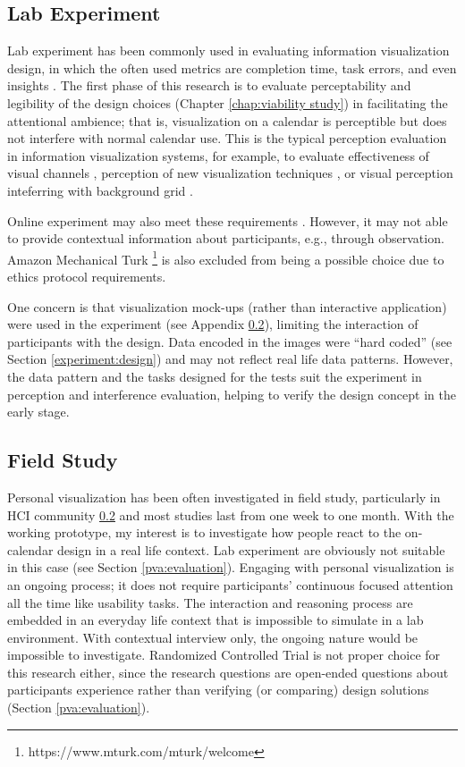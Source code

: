 \documentclass[12pt,oneside]{book}
\begin{document}
\subsection{Lab Experiment}
Lab experiment has been commonly used in evaluating information visualization design, in which the often used metrics are completion time, task errors, and even insights \cite{saraiya_evaluation_2004}.
The first phase of this research is to evaluate perceptability and legibility of the design choices (Chapter \ref{chap:viability study}) in facilitating the attentional ambience; that is, visualization on a calendar is perceptible but does not interfere with normal calendar use.  This is the typical perception evaluation in information visualization systems, for example, to evaluate effectiveness of visual channels \cite{mackinlay_automating_1986}, perception of new visualization techniques \cite{heer_sizing_2009}, or visual perception inteferring with background grid \cite{bartram_effect_2011}.

Online experiment may also meet these requirements \cite{cawthon_effect_2007}. However, it may not able to provide contextual information about participants, e.g., through observation. Amazon Mechanical Turk \footnote{https://www.mturk.com/mturk/welcome} is also excluded from being a possible choice due to ethics protocol requirements. 

One concern is that visualization mock-ups (rather than interactive application) were used in the experiment (see Appendix \ref{}), limiting the interaction of participants with the design.  Data encoded in the images were ``hard coded'' (see Section \ref{experiment:design}) and may not reflect real life data patterns.  However, the data pattern and the tasks designed for the tests suit the experiment in perception and interference evaluation, helping to verify the design concept in the early stage.

\subsection{Field Study}
Personal visualization has been often investigated in field study, particularly in HCI community \ref{} and most studies last from one week to one month.  With the working prototype, my interest is to investigate how people react to the on-calendar design in a real life context.  Lab experiment are obviously not suitable in this case (see Section \ref{pva:evaluation}).  Engaging with personal visualization is an ongoing process; it does not require participants' continuous focused attention all the time like usability tasks.  The interaction and reasoning process are embedded in an everyday life context that is impossible to simulate in a lab environment.  With contextual interview only, the ongoing nature would be impossible to investigate.  Randomized Controlled Trial is not proper choice for this research either, since the research questions are open-ended questions about participants experience rather than verifying (or comparing) design solutions (Section \ref{pva:evaluation}). 
\end{document}
